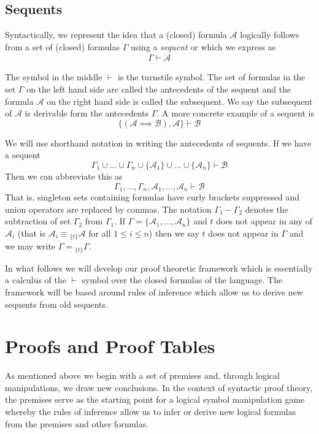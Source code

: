 \documentclass[12pt]{article}
\theoremstyle{break}
\theoremstyle{break}
\theoremstyle{break}
\theoremstyle{break}
\newcommand{\mc}[1]{\mathcal{#1}}
\begin{document}
\subsection{Sequents}

Syntactically, we represent the idea that a (closed) formula $\mc{A}$ logically follows from a set of (closed) formulas $\Gamma$ using a \textit{sequent} or  which we express as 
\begin{align}
\Gamma \vdash \mc{A}
\end{align}

The symbol in the middle $\vdash$ is the turnstile symbol.
The set of formulas in the set $\Gamma$ on the left hand side are called the antecedents of the sequent and the formula $\mc{A}$ on the right hand side is called the subsequent.
We say the subsequent of $\mc{A}$ is derivable form the antecedents $\Gamma$.
A more concrete example of a sequent is
$$
\{(\mc{A}\implies \mc{B}), \mc{A}\} \vdash \mc{B}
$$

We will use shorthand notation in writing the antecedents of sequents.
If we have a sequent 
$$
\Gamma_1\cup \ldots \cup \Gamma_n \cup \{\mc{A}_1\}\cup \ldots \cup \{\mc{A}_n\} \vdash \mc{B}
$$
Then we can abbreviate this as
$$
\Gamma_1,\ldots, \Gamma_n, \mc{A}_1,\ldots, \mc{A}_n \vdash \mc{B}
$$
That is, singleton sets containing formulas have curly brackets suppressed and union operators are replaced by commas.
The notation $\Gamma_1 - \Gamma_2$ denotes the subtraction of set $\Gamma_2$ from $\Gamma_1$.
If $\Gamma = \{\mc{A}_1, \ldots, \mc{A}_n\}$ and $t$ does not appear in any of $\mc{A}_i$ (that is $\mc{A}_i \equiv {_{\{t\}}\mc{A}}$ for all $1\le i \le n$) then we say $t$ does not appear in $\Gamma$ and we may write $\Gamma = {_{\{t\}}\Gamma}$.

In what follows we will develop our proof theoretic framework which is essentially a calculus of the $\vdash$ symbol over the closed formulas of the language.
The framework will be based around rules of inference which allow us to derive new sequents from old sequents.

\section{Proofs and Proof Tables}

As mentioned above we begin with a set of premises and, through logical manipulations, we draw new conclusions.
In the context of syntactic proof theory, the premises serve as the starting point for a logical symbol manipulation game whereby the rules of inference allow us to infer or derive new logical formulas from the premises and other formulas.
\end{document}
